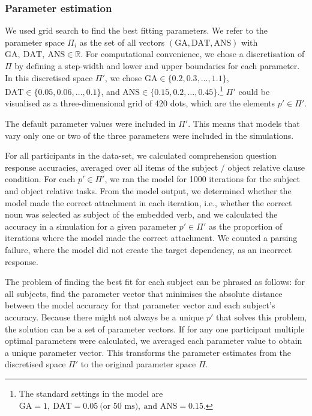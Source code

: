 \documentclass{cambridge7A}\usepackage[]{graphicx}\usepackage[]{color}
\begin{document}
\subsubsection{Parameter estimation}

We used grid search to find the best fitting parameters. We refer to the parameter space $\Pi_i$ as the set of all vectors $(\text{GA}, \text{DAT}, \text{ANS})$ with $\text{GA},\ \text{DAT},\ \text{ANS} \in \mathbb{R}$.
For computational convenience, we chose a discretisation of $\Pi$ by defining a step-width and lower and upper boundaries for each parameter. In this discretised space $\Pi'$, we chose $\text{GA} \in \{0.2, 0.3, \ldots, 1.1\}$, $\text{DAT} \in \{0.05, 0.06, \ldots, 0.1\}$, and $\text{ANS} \in \{0.15, 0.2, \ldots, 0.45\}$.\footnote{The standard settings in the \cite{LewisVasishth2005} model are $\text{GA} = 1,\ \text{DAT} = 0.05\ \text{(or 50 ms)},\ \text{and ANS} = 0.15$.} $\Pi'$ could be visualised as a three-dimensional grid of 420 dots, which are the elements $p' \in \Pi'$.

The default parameter values were included in $\Pi'$. This means that models that vary only one or two of the three parameters were included in the simulations. 


For all participants in the \cite{CaplanEtAl2015} data-set, we calculated comprehension question response accuracies, averaged over all items of the subject / object relative clause condition. For each $p' \in \Pi'$, we ran the model for 1000 iterations for the subject and object relative tasks.
From the model output, we determined whether the model made the correct attachment in each iteration, i.e., whether the correct noun was selected as subject of the embedded verb, and we calculated the accuracy in a simulation for a given parameter $p' \in \Pi'$ as the proportion of iterations where the model made the correct attachment. We counted a parsing failure, where the model did not create the target dependency, as an incorrect response.

The problem of finding the best fit for each subject can be phrased as follows: for all subjects, find the parameter vector that minimises the absolute distance between the model accuracy for that parameter vector and each subject's accuracy. Because there might not always be a unique $p'$ that solves this problem, the solution can be a set of parameter vectors.
If for any one participant multiple optimal parameters were calculated, we averaged each parameter value to obtain a unique parameter vector. This transforms the parameter estimates from the discretised space $\Pi'$ to the original parameter space $\Pi$.
\end{document}
